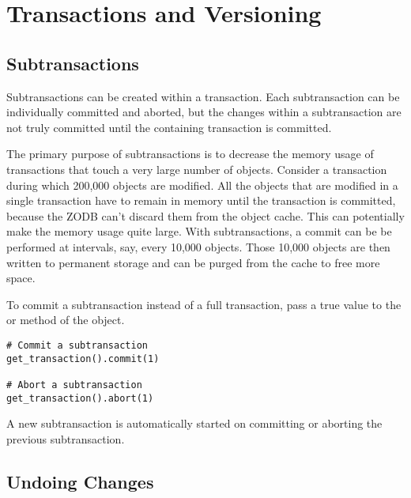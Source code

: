    

\section{Transactions and Versioning}


\subsection{Subtransactions}

Subtransactions can be created within a transaction.  Each
subtransaction can be individually committed and aborted, but the
changes within a subtransaction are not truly committed until the
containing transaction is committed.

The primary purpose of subtransactions is to decrease the memory usage
of transactions that touch a very large number of objects.  Consider a
transaction during which 200,000 objects are modified.  All the
objects that are modified in a single transaction have to remain in
memory until the transaction is committed, because the ZODB can't
discard them from the object cache.  This can potentially make the
memory usage quite large.  With subtransactions, a commit can be be
performed at intervals, say, every 10,000 objects.  Those 10,000
objects are then written to permanent storage and can be purged from
the cache to free more space.

To commit a subtransaction instead of a full transaction, 
pass a true value to the 
or  method of the  object.

\begin{verbatim}
# Commit a subtransaction
get_transaction().commit(1)	

# Abort a subtransaction
get_transaction().abort(1)   
\end{verbatim}

A new subtransaction is automatically started on committing or
aborting the previous subtransaction.


\subsection{Undoing Changes}

